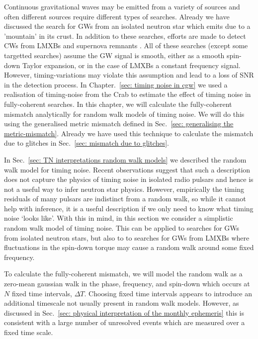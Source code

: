 \documentclass[../full_thesis/full_thesis.tex]{subfiles}
\begin{document}
Continuous gravitational waves may be emitted from a variety of sources and
often different sources require different types of searches.  Already we have
discussed the search for GWs from an isolated neutron star which emits due to a
'mountain' in its crust. In addition to these searches, efforts are made to
detect CWs from LMXBs \citep{ligo2015scox1} and supernova remnants
\citep{ligo_SNR2015}. All of these searches (except some targetted searches)
assume the GW signal is smooth, either as a smooth spin-down Taylor expansion,
or in the case of LMXBs a constant frequency signal. However, timing-variations
may violate this assumption and lead to a loss of SNR in the detection process.
In Chapter.~\ref{sec: timing noise in cgw} we used a realisation of
timing-noise from the Crab to estimate the effect of timing noise in
fully-coherent searches. In this chapter, we will calculate the fully-coherent mismatch
analytically for random walk models of timing noise. We will do this using the
generalised metric mismatch defined in Sec.~\ref{sec: generalising the
metric-mismatch}. Already we have used this technique to calculate the mismatch
due to glitches in Sec.~\eqref{sec: mismatch due to glitches}. 

In Sec.~\ref{sec: TN interpretations random walk models} we described the
random walk model for timing noise. Recent observations \citep{Hobbs2010}
suggest that such a description does not capture the physics of timing noise in
isolated radio pulsars and hence is not a useful way to infer neutron star
physics. However, empirically the timing residuals of many pulsars are
indistinct from a random walk, so while it cannot help with inference, it is a
useful description if we only need to know what timing noise `looks like'. With
this in mind, in this section we consider a simplistic random walk model of
timing noise. This can be applied to searches for GWs from isolated neutron
stars, but also to to searches for GWs from LMXBs where fluctuations in the
spin-down torque may cause a random walk around some fixed frequency.

To calculate the fully-coherent mismatch, we will model the random walk as a zero-mean
gaussian walk in the phase, frequency, and spin-down which occurs at $N$ fixed
time intervals, $\Delta T$. Choosing fixed time intervals appears to introduce
an additional timescale not usually present in random walk models. However, as
discussed in Sec.~\ref{sec: physical interpretation of the monthly
ephemeris} this is consistent with a large number of unresolved events which
are measured over a fixed time scale.
\end{document}
